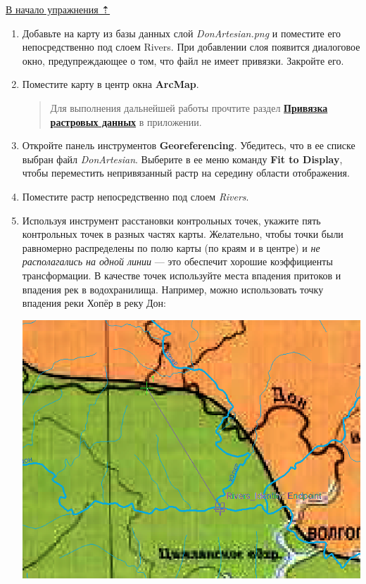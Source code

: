 \documentclass[12pt,]{book}
\begin{document}
\protect\hyperlink{map-ref-hydrogeologic}{В начало упражнения ⇡}

\begin{enumerate}
\def\labelenumi{\arabic{enumi}.}
\item
  Добавьте на карту из базы данных слой \emph{DonArtesian.png} и поместите его непосредственно под слоем Rivers. При добавлении слоя появится диалоговое окно, предупреждающее о том, что файл не имеет привязки. Закройте его.
\item
  Поместите карту в центр окна \textbf{ArcMap}.

  \begin{quote}
  Для выполнения дальнейшей работы прочтите раздел \textbf{\protect\hyperlink{manual-georef}{Привязка растровых данных}} в приложении.
  \end{quote}
\item
  Откройте панель инструментов \textbf{Georeferencing}. Убедитесь, что в ее списке выбран файл \emph{DonArtesian}. Выберите в ее меню команду \textbf{Fit to Display}, чтобы переместить непривязанный растр на середину области отображения.
\item
  Поместите растр непосредственно под слоем \emph{Rivers}.
\item
  Используя инструмент расстановки контрольных точек, укажите пять контрольных точек в разных частях карты. Желательно, чтобы точки были равномерно распределены по полю карты (по краям и в центре) и \emph{не располагались на одной линии} --- это обеспечит хорошие коэффициенты трансформации. В качестве точек используйте места впадения притоков и впадения рек в водохранилища. Например, можно использовать точку впадения реки Хопёр в реку Дон:

  \includegraphics{images/Ex06/image10.png}


\end{enumerate}
\end{document}
